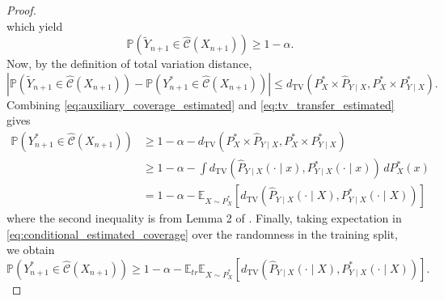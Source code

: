 \documentclass[11pt,letterpaper]{article}
\theoremstyle{definition}
\newcommand{\cC}{\mathcal{C}}
\newcommand{\E}{\mathbb{E}} %
\renewcommand{\P}{\mathbb{P}}
\begin{document}
\begin{proof}
\begin{equation*}
\end{equation*}
which yield
\begin{equation}
    \label{eq:auxiliary_coverage_estimated}
    \P\left(\tilde{Y}_{n+1}\in \hat{\cC}(X_{n+1})\right) \ge 1-\alpha.
\end{equation}
Now, by the definition of total variation distance,
\begin{equation}
    \label{eq:tv_transfer_estimated}
    \left|
    \P\left(\tilde{Y}_{n+1}\in \hat{\cC}(X_{n+1})\right) - \P\left(
    Y_{n+1}^\ast\in \hat{\cC}(X_{n+1})\right)\right|
    \le
    d_{\mathrm{TV}}\!\left(
    P_X^\ast\times \widehat P_{Y\mid X},
    P_X^\ast\times P_{Y\mid X}^\ast
    \right).
\end{equation}
Combining \eqref{eq:auxiliary_coverage_estimated} and \eqref{eq:tv_transfer_estimated} gives
\begin{equation}
    \label{eq:conditional_estimated_coverage}
    \begin{split}
        \P\left(Y_{n+1}^\ast\in \hat{\cC}(X_{n+1})\right) 
        & \ge 1-\alpha - d_{\mathrm{TV}}\!\left(P_X^\ast\times \widehat P_{Y\mid X}, P_X^\ast\times P_{Y\mid X}^\ast\right) \\
        & \ge 1 - \alpha - \int d_{\mathrm{TV}}\!\left(\widehat P_{Y\mid X}(\cdot\mid x), P_{Y\mid X}^\ast(\cdot\mid x)\right) \,dP_X^\ast(x) \\
        & = 1 - \alpha - \E_{X \sim P^\ast_X}\left[d_{\mathrm{TV}}\!\left(\widehat P_{Y\mid X}(\cdot\mid X), P_{Y\mid X}^\ast(\cdot\mid X)\right)\right]
    \end{split}
\end{equation}
where the second inequality is from Lemma 2 of \cite{hur2026inference}. Finally, taking expectation in \eqref{eq:conditional_estimated_coverage} over the randomness in the training split, we obtain
\[
    \P\left(Y_{n+1}^\ast\in \hat{\cC}(X_{n+1})\right) \ge 1-\alpha - \E_{tr} \E_{X \sim P^\ast_X}\left[d_{\mathrm{TV}}\!\left(\widehat P_{Y\mid X}(\cdot\mid X), P_{Y\mid X}^\ast(\cdot\mid X)\right)\right].
\]
\end{proof}
\end{document}
